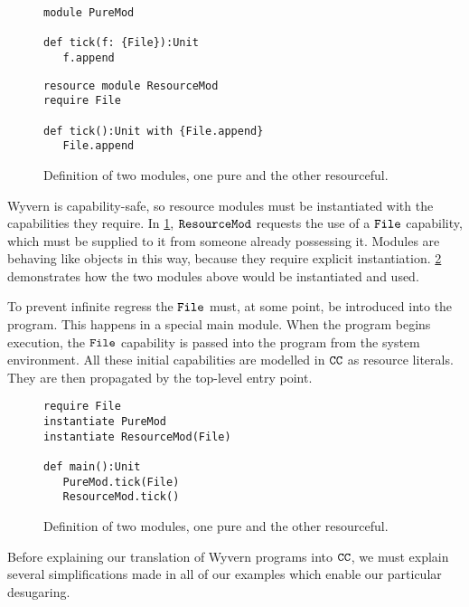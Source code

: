 \begin{figure}[h]

\begin{lstlisting}
module PureMod

def tick(f: {File}):Unit
   f.append

\end{lstlisting}

\begin{lstlisting}
resource module ResourceMod
require File

def tick():Unit with {File.append}
   File.append
\end{lstlisting}

\caption{Definition of two modules, one pure and the other resourceful.}
\label{fig:wyv_modules}
\end{figure}

Wyvern is capability-safe, so resource modules must be instantiated with the capabilities they require. In \ref{fig:wyv_modules}, $\mathtt{ResourceMod}$ requests the use of a $\mathtt{File}$ capability, which must be supplied to it from someone already possessing it. Modules are behaving like objects in this way, because they require explicit instantiation. \ref{fig:wyv_module_instantiation} demonstrates how the two modules above would be instantiated and used.

To prevent infinite regress the $\mathtt{File}$ must, at some point, be introduced into the program. This happens in a special main module. When the program begins execution, the $\mathtt{File}$ capability is passed into the program from the system environment. All these initial capabilities are modelled in $\mathtt{CC}$ as resource literals. They are then propagated by the top-level entry point.

\begin{figure}[h]

\begin{lstlisting}
require File
instantiate PureMod
instantiate ResourceMod(File)

def main():Unit
   PureMod.tick(File)
   ResourceMod.tick()
\end{lstlisting}

\caption{Definition of two modules, one pure and the other resourceful.}
\label{fig:wyv_module_instantiation}
\end{figure}

Before explaining our translation of Wyvern programs into $\mathtt{CC}$, we must explain several simplifications made in all of our examples which enable our particular desugaring.

